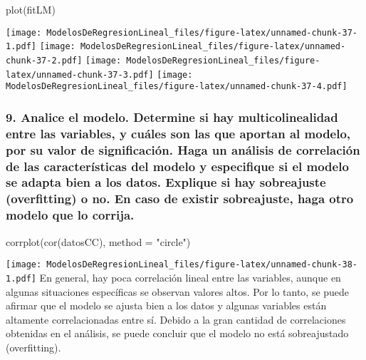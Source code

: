 \documentclass[
]{article}
\newenvironment{Shaded}{\begin{snugshade}}{\end{snugshade}}
\newcommand{\AttributeTok}[1]{\textcolor[rgb]{0.77,0.63,0.00}{#1}}
\newcommand{\FunctionTok}[1]{\textcolor[rgb]{0.00,0.00,0.00}{#1}}
\newcommand{\NormalTok}[1]{#1}
\newcommand{\StringTok}[1]{\textcolor[rgb]{0.31,0.60,0.02}{#1}}
\begin{document}
\begin{Shaded}
\begin{Highlighting}[]
\FunctionTok{plot}\NormalTok{(fitLM)}
\end{Highlighting}
\end{Shaded}

\texttt{[image: ModelosDeRegresionLineal\_files/figure-latex/unnamed-chunk-37-1.pdf]}
\texttt{[image: ModelosDeRegresionLineal\_files/figure-latex/unnamed-chunk-37-2.pdf]}
\texttt{[image: ModelosDeRegresionLineal\_files/figure-latex/unnamed-chunk-37-3.pdf]}
\texttt{[image: ModelosDeRegresionLineal\_files/figure-latex/unnamed-chunk-37-4.pdf]}

\hypertarget{analice-el-modelo.-determine-si-hay-multicolinealidad-entre-las-variables-y-cuuxe1les-son-las-que-aportan-al-modelo-por-su-valor-de-significaciuxf3n.-haga-un-anuxe1lisis-de-correlaciuxf3n-de-las-caracteruxedsticas-del-modelo-y-especifique-si-el-modelo-se-adapta-bien-a-los-datos.-explique-si-hay-sobreajuste-overfitting-o-no.-en-caso-de-existir-sobreajuste-haga-otro-modelo-que-lo-corrija.}{%
\subsubsection{9. Analice el modelo. Determine si hay multicolinealidad
entre las variables, y cuáles son las que aportan al modelo, por su
valor de significación. Haga un análisis de correlación de las
características del modelo y especifique si el modelo se adapta bien a
los datos. Explique si hay sobreajuste (overfitting) o no. En caso de
existir sobreajuste, haga otro modelo que lo
corrija.}\label{analice-el-modelo.-determine-si-hay-multicolinealidad-entre-las-variables-y-cuuxe1les-son-las-que-aportan-al-modelo-por-su-valor-de-significaciuxf3n.-haga-un-anuxe1lisis-de-correlaciuxf3n-de-las-caracteruxedsticas-del-modelo-y-especifique-si-el-modelo-se-adapta-bien-a-los-datos.-explique-si-hay-sobreajuste-overfitting-o-no.-en-caso-de-existir-sobreajuste-haga-otro-modelo-que-lo-corrija.}}

\begin{Shaded}
\begin{Highlighting}[]
\FunctionTok{corrplot}\NormalTok{(}\FunctionTok{cor}\NormalTok{(datosCC), }\AttributeTok{method =} \StringTok{"circle"}\NormalTok{)}
\end{Highlighting}
\end{Shaded}

\texttt{[image: ModelosDeRegresionLineal\_files/figure-latex/unnamed-chunk-38-1.pdf]}
En general, hay poca correlación lineal entre las variables, aunque en
algunas situaciones específicas se observan valores altos. Por lo tanto,
se puede afirmar que el modelo se ajusta bien a los datos y algunas
variables están altamente correlacionadas entre sí. Debido a la gran
cantidad de correlaciones obtenidas en el análisis, se puede concluir
que el modelo no está sobreajustado (overfitting).
\end{document}
